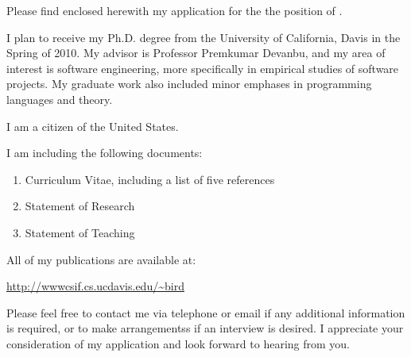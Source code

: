 \documentclass[12pt]{newlfm}
\begin{document}

\begin{newlfm} 

Please find enclosed herewith my application for the the position of
\jobposition \joblocation.

I plan to receive my Ph.D. degree from the University of California, Davis in
the Spring of 2010.  My advisor is Professor Premkumar Devanbu, and my area of
interest is software engineering, more specifically in empirical studies of
software projects.  My graduate work also included minor emphases in 
programming languages and theory.

I am a citizen of the United States.

I am including the following documents:

\begin{enumerate}
\item Curriculum Vitae, including a list of five references
\item Statement of Research
\item Statement of Teaching
\end{enumerate}

All of my publications are available at:

{\small \url{http://wwwcsif.cs.ucdavis.edu/~bird}}

Please feel free to contact me via telephone or email if any additional
information is required, or to make arrangementss if an interview is desired.
I appreciate your consideration of my application and look forward to hearing from
you.

\end{newlfm} 
\end{document}
